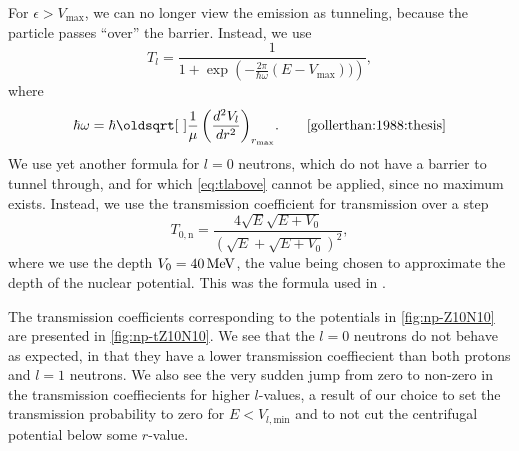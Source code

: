 For $\epsilon>V_\text{max}$, we can no longer view the emission as tunneling, because the particle passes ``over'' the barrier. Instead, we use
\begin{equation}
T_l = \frac{1}{1+\exp{\left(-\frac{2\pi}{\hbar \omega}(E-V_\text{max}))\right)}},\label{eq:tlabove}
\end{equation}
where
\begin{equation}
\hbar\omega = \hbar\sqrt{\frac{1}{\mu}\left(\frac{d^2V_l}{dr^2}\right)_{r_\text{max}}}.\qquad\cite{gollerthan:1988:thesis}
\end{equation}
We use yet another formula for $l=0$ neutrons, which do not have a barrier to tunnel through, and for which \autoref{eq:tlabove} cannot be applied, since no maximum exists. Instead, we use the transmission coefficient for transmission over a step 
\begin{equation}
T_{0,\text{n}} = \frac{4\sqrt{E}\sqrt{E+V_0}}{(\sqrt{E}+\sqrt{E+V_0})^2},\label{eq:t0n}
\end{equation}
where we use the depth $V_0=\unit[40]{MeV}$, the value being chosen to approximate the depth of the nuclear potential\cite{welldepth}. This was the formula used in .

The transmission coefficients corresponding to the potentials in \autoref{fig:np-Z10N10} are presented in \autoref{fig:np-tZ10N10}.  We see that the $l=0$ neutrons do not behave as expected, in that they have a lower transmission coeffiecient than both protons and $l=1$ neutrons. We also see the very sudden jump from zero to non-zero in the transmission coeffiecients for higher $l$-values, a result of our choice to set the transmission probability to zero for $E<V_{l,\text{min}}$ and to not cut the centrifugal potential below some $r$-value.

